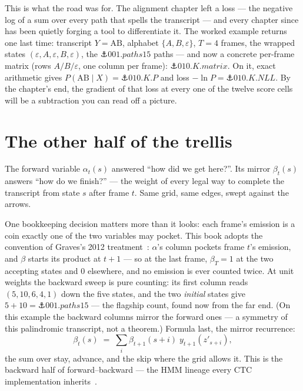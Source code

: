 \begin{narrative}
This is what the road was for. The alignment chapter left a loss —
the negative log of a sum over every path that spells the
transcript — and every chapter since has been quietly forging a tool
to differentiate it. The worked example returns one last time:
transcript $Y = \mathrm{AB}$, alphabet $\{A, B, \varepsilon\}$,
$T = 4$ frames, the wrapped states $(\varepsilon, A, \varepsilon, B,
\varepsilon)$, the $\anchor{001.paths15}$ paths — and now a concrete
per-frame matrix (rows $A/B/\varepsilon$, one column per frame):
$\anchor{010.K.matrix}$. On it, exact arithmetic gives
$P(\mathrm{AB} \mid X) = \anchor{010.K.P}$ and loss
$-\ln P = \anchor{010.K.NLL}$. By the chapter's end, the gradient of
that loss at every one of the twelve score cells will be a
subtraction you can read off a picture.

\section{The other half of the trellis}

The forward variable $\alpha_t(s)$ answered ``how did we get
here?''. Its mirror $\beta_t(s)$ answers ``how do we finish?'' — the
weight of every legal way to complete the transcript from state $s$
after frame $t$. Same grid, same edges, swept against the arrows.

One bookkeeping decision matters more than it looks: each frame's
emission is a coin exactly one of the two variables may pocket.
This book adopts the convention of Graves's 2012
treatment~\cite{deep_learning-alex-graves-supervised-sequence-labelling-with-rnns-2012}:
$\alpha$'s column pockets frame $t$'s emission, and $\beta$ starts
its product at $t + 1$ — so at the last frame, $\beta_T = 1$ at the
two accepting states and $0$ elsewhere, and no emission is ever
counted twice. At unit weights the backward sweep is pure counting:
its first column reads $(5, 10, 6, 4, 1)$ down the five states, and
the two \emph{initial} states give $5 + 10 = \anchor{001.paths15}$ —
the flagship count, found now from the far end. (On this example the
backward columns mirror the forward ones — a symmetry of this
palindromic transcript, not a theorem.) Formula last, the mirror
recurrence:
\[
  \beta_t(s) \;=\; \sum_{i} \beta_{t+1}(s{+}i)\; y_{t+1}(z'_{s+i}),
\]
the sum over stay, advance, and the skip where the grid allows it.
This is the backward half of forward--backward — the HMM lineage
every CTC implementation
inherits~\cite{deep_learning-lawrence-r-rabiner-the-hmm-tutorial-proc-ieee-1989}.


\end{narrative}
